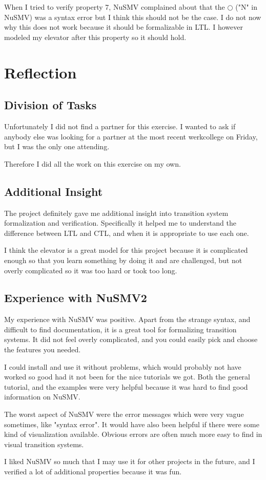 \documentclass[12pt, a4paper]{article}
\begin{document}
When I tried to verify property 7, NuSMV complained about that the $\bigcirc$ ("N" in NuSMV) was a syntax error but I think this should not be the case. I do not now why this does not work because it should be formalizable in LTL. I however modeled my elevator after this property so it should hold.

\section{Reflection}
\subsection{Division of Tasks}
Unfortunately I did not find a partner for this exercise. I wanted to ask if anybody else was looking for a partner at the most recent werkcollege on Friday, but I was the only one attending.

Therefore I did all the work on this exercise on my own.

\subsection{Additional Insight}
The project definitely gave me additional insight into transition system formalization and verification. Specifically it helped me to understand the difference between LTL and CTL, and when it is appropriate to use each one.

I think the elevator is a great model for this project because it is complicated enough so that you learn something by doing it and are challenged, but not overly complicated so it was too hard or took too long.

\subsection{Experience with NuSMV2}
My experience with NuSMV was positive. Apart from the strange syntax, and difficult to find documentation, it is a great tool for formalizing transition systems. It did not feel overly complicated, and you could easily pick and choose the features you needed.

I could install and use it without problems, which would probably not have worked so good had it not been for the nice tutorials we got. Both the general tutorial, and the examples were very helpful because it was hard to find good information on NuSMV.

The worst aspect of NuSMV were the error messages which were very vague sometimes, like "syntax error". It would have also been helpful if there were some kind of visualization available. Obvious errors are often much more easy to find in visual transition systems.

I liked NuSMV so much that I may use it for other projects in the future, and I verified a lot of additional properties because it was fun.
\end{document}
